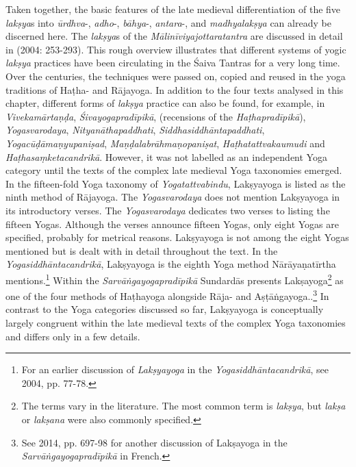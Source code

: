 {Taken together, the basic features of the late medieval differentiation of the five \textit{lakṣya}s into \textit{ūrdhva}-, \textit{adho}-, \textit{bāhya}-, \textit{antara}-, and \textit{madhyalakṣya} can already be discerned here. The \textit{lakṣya}s of the \textit{Mālinīviyajottaratantra} are discussed in detail in \citeauthor{vasudeva2004} (2004: 253-293). This rough overview illustrates that different systems of yogic \textit{lakṣya} practices have been circulating in the Śaiva Tantras for a very long time. Over the centuries, the techniques were passed on, copied and reused in the yoga traditions of Haṭha- and Rājayoga. In addition to the four texts analysed in this chapter, different forms of \textit{lakṣya} practice can also be found, for example, in \textit{Vivekamārtaṇḍa}, \textit{Śivayogapradīpikā}, (recensions of the \textit{Haṭhapradīpikā}), \textit{Yogasvarodaya}, \textit{Nityanāthapaddhati}, \textit{Siddhasiddhāntapaddhati}, \textit{Yogacūḍāmaṇyupaniṣad}, \textit{Maṇḍalabrāhmaṇopaniṣat}, \textit{Haṭhatattvakaumudi} and \textit{Haṭhasaṃketacandrikā}.} However, it was not labelled as an independent Yoga category until the texts of the complex late medieval Yoga taxonomies emerged. In the fifteen-fold Yoga taxonomy of \textit{Yogatattvabindu}, Lakṣyayoga is listed as the ninth method of Rājayoga. The \textit{Yogasvarodaya} does not mention Lakṣyayoga in its introductory verses. The \textit{Yogasvarodaya} dedicates two verses to listing the fifteen Yogas. Although the verses announce fifteen Yogas, only eight Yogas are specified, probably for metrical reasons. Lakṣyayoga is not among the eight Yogas mentioned but is dealt with in detail throughout the text. In the \textit{Yogasiddhāntacandrikā}, Lakṣyayoga is the eighth Yoga method Nārāyaṇatīrtha mentions.\footnote{For an earlier discussion of \textit{Lakṣyayoga} in the \textit{Yogasiddhāntacandrikā}, see \citeauthor{penna2004} 2004, pp. 77-78.} Within the \textit{Sarvāṅgayogapradīpikā} Sundardās presents Lakṣayoga\footnote{The terms vary in the literature. The most common term is \textit{lakṣya}, but \textit{lakṣa} or \textit{lakṣana} were also commonly specified.} as one of the four methods of Haṭhayoga alongside Rāja- and Aṣṭāṅgayoga..\footnote{See \citeauthor{burger2014sarvangayogapradipika} 2014, pp. 697-98 for another discussion of Lakṣayoga in the \textit{Sarvāṅgayogapradīpikā} in French.} In contrast to the Yoga categories discussed so far, Lakṣyayoga is conceptually largely congruent within the late medieval texts of the complex Yoga taxonomies and differs only in a few details.

